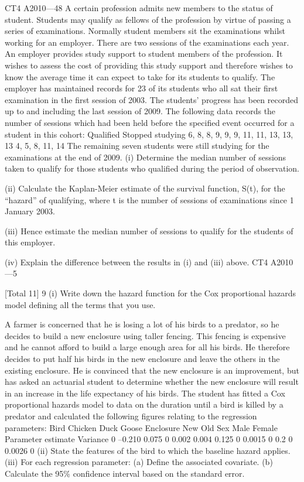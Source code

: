 \documentclass[a4paper,12pt]{article}
\begin{document}
\begin{enumerate}
CT4 A2010—48
A certain profession admits new members to the status of student. Students may
qualify as fellows of the profession by virtue of passing a series of examinations.
Normally student members sit the examinations whilst working for an employer.
There are two sessions of the examinations each year.
An employer provides study support to student members of the profession. It wishes
to assess the cost of providing this study support and therefore wishes to know the
average time it can expect to take for its students to qualify.
The employer has maintained records for 23 of its students who all sat their first
examination in the first session of 2003. The students’ progress has been recorded up
to and including the last session of 2009. The following data records the number of
sessions which had been held before the specified event occurred for a student in this
cohort:
Qualified
Stopped studying
6, 8, 8, 9, 9, 9, 11, 11, 13, 13, 13
4, 5, 8, 11, 14
The remaining seven students were still studying for the examinations at the end of
2009.
(i) Determine the median number of sessions taken to qualify for those students
who qualified during the period of observation.
 
(ii) Calculate the Kaplan-Meier estimate of the survival function, S(t), for the
“hazard” of qualifying, where t is the number of sessions of examinations
since 1 January 2003.
 
(iii) Hence estimate the median number of sessions to qualify for the students of
this employer.
 
(iv) Explain the difference between the results in (i) and (iii) above.
CT4 A2010—5
 
[Total 11]
9
(i)
Write down the hazard function for the Cox proportional hazards
model defining all the terms that you use.
 
A farmer is concerned that he is losing a lot of his birds to a predator, so he decides to
build a new enclosure using taller fencing. This fencing is expensive and he cannot
afford to build a large enough area for all his birds. He therefore decides to put half
his birds in the new enclosure and leave the others in the existing enclosure. He is
convinced that the new enclosure is an improvement, but has asked an actuarial
student to determine whether the new enclosure will result in an increase in the life
expectancy of his birds. The student has fitted a Cox proportional hazards model to
data on the duration until a bird is killed by a predator and calculated the following
figures relating to the regression parameters:
Bird Chicken
Duck
Goose
Enclosure New
Old
Sex Male
Female
Parameter estimate Variance
0
–0.210
0.075 0
0.002
0.004
0.125
0 0.0015
0
0.2
0 0.0026
0
(ii) State the features of the bird to which the baseline hazard applies.
(iii) For each regression parameter:
(a) Define the associated covariate.
(b) Calculate the 95\% confidence interval based on the standard error.
 

\end{enumerate}
\end{document}

